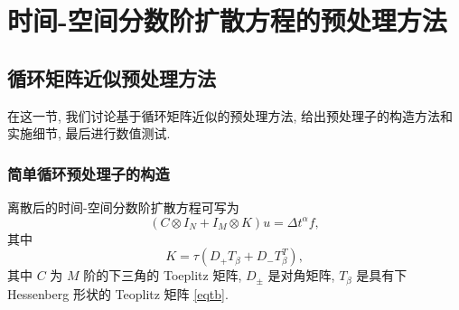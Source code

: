 \documentclass{ecnumaster}
\begin{document}
\chapter{时间-空间分数阶扩散方程的预处理方法}

\section{循环矩阵近似预处理方法}
在这一节, 我们讨论基于循环矩阵近似的预处理方法,
给出预处理子的构造方法和实施细节, 最后进行数值测试.

\subsection{简单循环预处理子的构造}
离散后的时间-空间分数阶扩散方程可写为
\begin{equation}
  (C \otimes I_N + I_M \otimes K)u = \Delta t^{\alpha}f,
\end{equation}
其中
$$
  K = \tau(D_+T_{\beta} + D_-T_{\beta}^T),
$$
其中 $C$ 为 $M$ 阶的下三角的 Toeplitz 矩阵, $D_{\pm}$ 是对角矩阵,
$T_{\beta}$ 是具有下 Hessenberg 形状的 Teoplitz 矩阵 \eqref{eqtb}.
\end{document}
